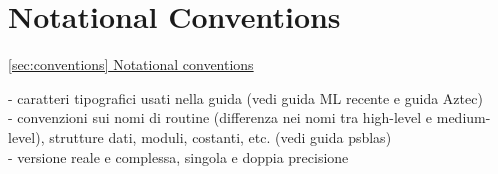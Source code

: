 \section{Notational Conventions\label{sec:conventions}}
         {\underline{\ref{sec:conventions} Notational conventions}}

    - caratteri tipografici usati nella guida (vedi guida ML recente e guida Aztec) \\
    - convenzioni sui nomi di routine (differenza nei nomi tra high-level e medium-level),
      strutture dati, moduli, costanti, etc. (vedi guida psblas) \\
    - versione reale e complessa, singola e doppia precisione\\